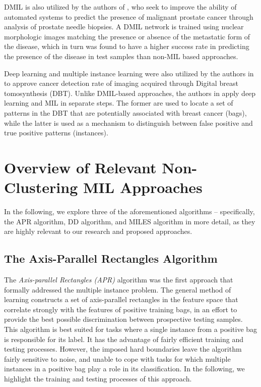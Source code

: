 \documentclass[12pt,dvips]{report}
\numberwithin{equation}{section}
\begin{document}
DMIL is also utilized by the authors of \cite{ing2018deep}, who seek to improve the ability of automated systems to predict the presence of malignant prostate cancer through analysis of prostate needle biopsies.  A DMIL network is trained using nuclear morphologic images matching the presence or absence of the metastatic form of the disease, which in turn was found to have a higher success rate in predicting the presence of the disease in test samples than non-MIL based approaches.

 Deep learning and multiple instance learning were also utilized by the authors in to approve cancer detection rate of imaging acquired through Digital breast tomosynthesis (DBT).  Unlike DMIL-based approaches, the authors in \cite{yousefi2018mass} apply deep learning and MIL in separate steps.  The former are used to locate a set of patterns in the DBT that are potentially associated with breast cancer (bags), while the latter is used as a mechanism to distinguish between false positive and true positive patterns (instances).



\section{Overview of Relevant Non-Clustering MIL Approaches} \label{sec:RelatedWork_Relevant}

In the following, we explore three of the aforementioned algorithms -- specifically, the APR algorithm, DD algorithm, and MILES algorithm in more detail, as they are highly relevant to our research and proposed approaches.

\subsection{The Axis-Parallel Rectangles Algorithm}

The \emph{Axis-parallel Rectangles (APR)} algorithm \cite{diet97} was the first approach that formally addressed the multiple instance problem. The general method of learning constructs a set of axis-parallel rectangles in the feature space that correlate strongly with the features of positive training bags, in an effort to provide the best possible discrimination between prospective testing samples. This algorithm is best suited for tasks where a single instance from a positive bag is responsible for its label. It has the advantage of fairly efficient training and testing processes. However, the imposed hard boundaries leave the algorithm fairly sensitive to noise, and unable to cope with tasks for which multiple instances in a positive bag play a role in its classification. In the following, we highlight the training and testing processes of this approach.
\end{document}
